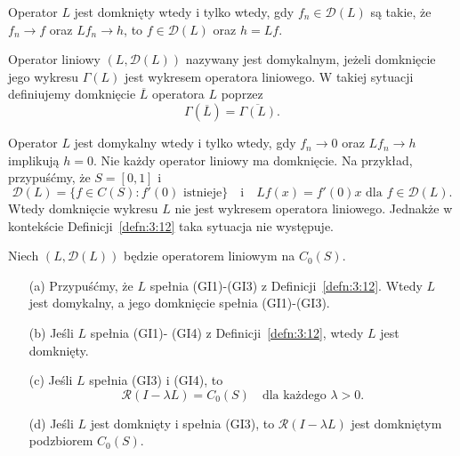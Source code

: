 \documentclass{article}
\begin{document}
	Operator $L$ jest domknięty wtedy i tylko wtedy, gdy $f_n \in \mathcal{D}(L)$ są takie, że
	$f_n \to f$ oraz $Lf_n \to h$, to $f \in \mathcal{D}(L)$ oraz $h=Lf$.

	\begin{defn}
		Operator liniowy $(L, \mathcal{D}(L))$ nazywany jest domykalnym, jeżeli
		domknięcie jego wykresu $\Gamma(L)$ jest wykresem operatora liniowego. W takiej
		sytuacji  definiujemy domknięcie $\overline{L}$ operatora $L$
		poprzez
		\begin{equation*}
			\Gamma \left( \overline{L} \right) = \overline{\Gamma(L)}.
		\end{equation*}
	\end{defn}

	Operator $L$ jest domykalny wtedy i tylko wtedy, gdy $f_n \to 0$ oraz $Lf_n \to h$ implikują
	$h=0$. Nie każdy operator liniowy ma domknięcie. Na przykład, przypuśćmy, że \( S = [0, 1] \) i
	\[
		\mathcal{D}(L) = \{ f \in C(S) : f'(0) \text{ istnieje} \}
		\quad \text{i} \quad Lf(x) = f'(0)x \text{ dla } f \in \mathcal{D}(L).
	\]
	Wtedy domknięcie wykresu \( L \) nie jest wykresem operatora liniowego.
	Jednakże w kontekście Definicji~\ref{defn:3:12} taka sytuacja nie występuje.

	\begin{fak}\label{fak:3:30}
		Niech $(L, \mathcal{D}(L))$ będzie operatorem liniowym na $C_0(S)$.
		\begin{itemize}
    			\item[(a)] Przypuśćmy, że \( L \) spełnia (GI1)-(GI3) 
				z Definicji~\ref{defn:3:12}.
				Wtedy $L$ jest domykalny, a jego domknięcie spełnia (GI1)-(GI3).
    			\item[(b)] Jeśli \( L \) spełnia (GI1)- (GI4) z Definicji~\ref{defn:3:12},
				wtedy \( L \) jest domknięty.
			\item[(c)] Jeśli $L$ 
				spełnia (GI3) i (GI4), to
    				\[
    					\mathcal{R}(I - \lambda L) 
					= C_0(S) \quad \text{dla każdego } \lambda > 0.
    				\]
    			\item[(d)] Jeśli $L$ jest domknięty i spełnia (GI3), to 
				$\mathcal{R}(I - \lambda L)$ 
				jest domkniętym podzbiorem $C_0(S)$.
		\end{itemize}
	\end{fak}
\end{document}
